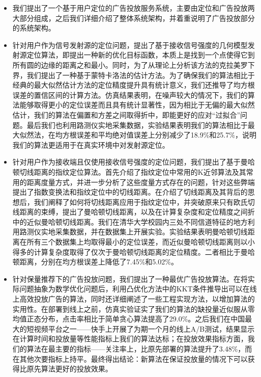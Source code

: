 \begin{itemize}
	
	\item 我们提出了一个基于用户定位的广告投放服务系统，主要由定位和广告投放两大部分组成，之后我们详细介绍了整体系统架构，并着重说明了广告投放部分的系统架构。
	
	\item 针对用户作为信号发射源的定位问题，提出了基于接收信号强度的几何模型发射源定位算法，即提出一种新的优化目标函数，本质上是找到一个点使得它到所有圆的边缘的距离之和最小。同时，为了从理论上分析该方法的克拉美罗下界，我们提出了一种基于蒙特卡洛法的估计方法。为了确保我们的算法相比于经典的最大似然估计方法的定位精度提升具有统计意义，我们还推导了均方根误差的置信区间的计算方法。仿真结果表明，在噪声较大的情况下，我们的算法能够取得更小的定位误差而且具有统计显著性，因为相比于无偏的最大似然估计，我们的算法在偏置和方差之间取得折中，即能更好的应对“过拟合”问题。最后我们也利用路测仪实地采集数据，实验结果表明我们的算法相比于最大似然法，在均方根误差和平均绝对值误差上分别减少了18.9\%和25.7\%，说明我们的算法更适用于在真实环境中对发射源定位。
	
	\item 针对用户作为接收端且仅使用接收信号强度的定位问题，我们提出了基于曼哈顿切线距离的指纹定位算法。首先介绍了指纹定位中常用的K近邻算法及其常用的距离度量方式，并进一步分析了这些度量方式存在的问题，针对这些弊端提出了指数变换法和指纹定位中的切线距离。在介绍了切线距离及其背后的思想后，我们阐释了如何将切线距离应用于指纹定位中，并突破原来只有欧氏切线距离的束缚，提出了曼哈顿切线距离，以及在计算复杂度和定位精度之间折中的近似曼哈顿切线距离。我们在清华大学校园内三处不同信道特征的地方利用路测仪实地采集数据，并在数据集上开展实验。实验结果表明曼哈顿切线距离在所有三个数据集上均取得最小的定位误差，而近似曼哈顿切线距离则以小得多的计算复杂度取得了仅次于曼哈顿切线距离的定位精度。二者相比于曼哈顿距离，分别在均方根误差上降低了7.45\%和5.02\%。
	
	\item 针对保量推荐下的广告投放问题，我们提出了一种最优广告投放算法。在将实际问题抽象为数学优化问题后，利用凸优化方法中的KKT条件推导出可以在线上高效投放广告的算法，同时还详细阐述了一些工程实现方法，以增加算法的实用性。在部署到线上之前，仿真实验证实了我们的算法的缺投量近似服从零均值正态分布，点击率相比于简单贪心算法提高了29.0\%。之后我们在中国最大的短视频平台之一——快手上开展了为期一个月的线上A/B测试，结果显示在计算时间和投放量等性能指标上我们的算法达标；在投放效果指标方面，我们的算法在最主要的指标——关注率上，比原先部署的算法提升了3.48\%，而在其他次要指标上持平。最终得出结论：新算法在保证投放量的情况下可以获得比原先算法更好的投放效果。
\end{itemize}

